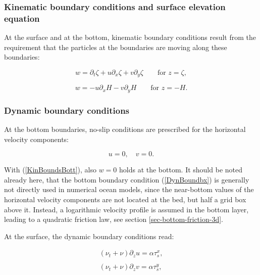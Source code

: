 \subsubsection{Kinematic boundary conditions and surface elevation equation}

At the surface and at the bottom, kinematic boundary conditions
result from the requirement that 
the particles at the boundaries are moving along these boundaries:

\begin{equation}\label{KinBoundsSurf}
w= \partial_t \zeta +  u \partial_x\zeta + v \partial_y \zeta
\qquad \mbox{for } z=\zeta,
\end{equation}

\begin{equation}\label{KinBoundsBott}
w= - u \partial_xH - v \partial_y H
\qquad \mbox{for } z=-H.
\end{equation}

\subsubsection{Dynamic boundary conditions}\label{SectionDynBounds}

At the bottom boundaries, no-slip conditions are prescribed for the horizontal
velocity components:

\begin{equation}\label{DynBoundbx}
u=0, \quad v=0.
\end{equation}

With (\ref{KinBoundsBott}), also $w=0$ holds at the bottom.
It should be noted already here, that the bottom boundary condition
(\ref{DynBoundbx}) is generally not directly used in numerical ocean models,
since the near-bottom values of the horizontal velocity components
are not located at the bed, but half a grid box above it.
Instead, a logarithmic velocity profile is assumed in the bottom layer,
leading to a quadratic friction law, see section \ref{sec-bottom-friction-3d}.

At the surface, the dynamic boundary conditions read:

\begin{equation}\label{DynBoundSx}
\begin{array}{l}
(\nu_t+\nu) \partial_z u=\alpha \tau^x_{s},
\\ \\
(\nu_t+\nu) \partial_z v=\alpha \tau^y_{s},
\end{array}
\end{equation}

